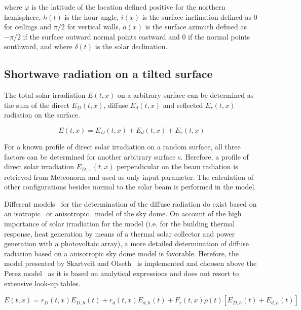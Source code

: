 where $\varphi$ is the latitude of the location defined positive for the northern hemisphere, $h(t)$ is the hour angle, $i(x)$ is the surface inclination defined as 0 for ceilings and $\pi/2$ for vertical walls, $a(x)$ is the surface azimuth defined as $-\pi/2$ if the surface outward normal points eastward and 0 if the normal points southward, and where $\delta(t)$ is the solar declination.

\subsection{Shortwave radiation on a tilted surface}

The total solar irradiation $E(t,x)$ on a arbitrary surface can be determined as the sum of the direct $E_{D}(t,x)$, diffuse $E_{d}(t,x)$ and reflected $E_{r}(t,x)$ radiation on the surface. 

\begin{equation}
E(t,x)=E_{D}(t,x)+E_{d}(t,x)+E_{r}(t,x)
\end{equation}

For a known profile of direct solar irradiation on a random surface, all three factors can be determined for another arbitrary surface s. Herefore, a profile of direct solar irradiation $E_{D,\bot}(t,x)$ perpendicular on the beam radiation is retrieved from Meteonorm and used as only input parameter. The calculation of other configurations besides normal to the solar beam is performed in the model. 

Different models~\cite{Noorian2008} for the determination of the diffuse radiation do exist based on an isotropic~\cite{Liu1962,Tian2001,Badescu2002} or anisotropic~\cite{Temps1977,Klucher1979,Hay1979,Steven1980,Perez1986,Perez1987,Skartveit1986,Skartveit1987,Reindl1990} model of the sky dome. On account of the high importance of solar irradiation for the model (i.e. for the building thermal response, heat generation by means of a thermal solar collector and power generation with a photovoltaic array), a more detailed determination of diffuse radiation based on a anisotropic sky dome model is favorable. Herefore, the model presented by Skartveit and Olseth~\cite{Skartveit1987} is implemented and choosen above the Perez model~\cite{Perez1986,Perez1987} as it is based on analytical expressions and does not resort to extensive look-up tables.

\begin{dmath}
E(t,x)=r_{D}(t,x)E_{D,h}(t)+r_{d}(t,x)E_{d,h}(t)+F_{r}(t,x)\rho(t)\left[E_{D,h}(t)+E_{d,h}(t)\right]
\end{dmath}

